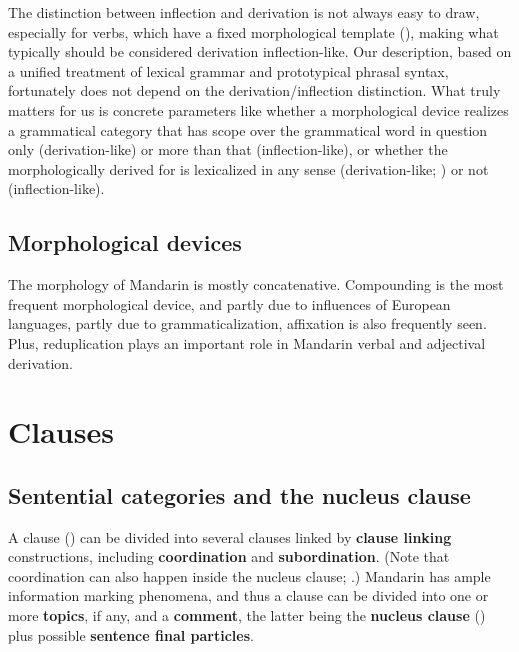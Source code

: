 \documentclass[UTF8, a4paper, oneside, scheme=plain, 12pt]{ctexrep}
\newcommand*{\concept}[1]{\textbf{#1}}
\begin{document}
The distinction between inflection and derivation is not always easy to draw,
especially for verbs,
which have a fixed morphological template (),
making what typically should be considered derivation inflection-like.
Our description, based on a unified treatment of lexical grammar and prototypical phrasal syntax,
fortunately does not depend on the derivation/inflection distinction.
What truly matters for us is concrete parameters like whether a morphological device
realizes a grammatical category that has scope over the grammatical word in question only
(derivation-like) or more than that (inflection-like),
or whether the morphologically derived for is lexicalized in any sense (derivation-like; )
or not (inflection-like).

\subsection{Morphological devices}

The morphology of Mandarin is mostly concatenative.
Compounding is the most frequent morphological device,
and partly due to influences of European languages, partly due to grammaticalization,
affixation is also frequently seen.
Plus, reduplication plays an important role in Mandarin verbal and adjectival derivation.

\section{Clauses}\label{sec:grammatical.clause}

\subsection{Sentential categories and the nucleus clause}\label{sec:grammatical.clause.high-level}

A clause () can be divided into several clauses 
linked by \concept{clause linking} constructions,
including \concept{coordination} and \concept{subordination}.
(Note that coordination can also happen inside the nucleus clause;
.)
Mandarin has ample information marking phenomena,
and thus a clause can be divided into
one or more \concept{topics}, if any, and a \concept{comment},
the latter being the \concept{nucleus clause} ()
plus possible \concept{sentence final particles}.
\end{document}
